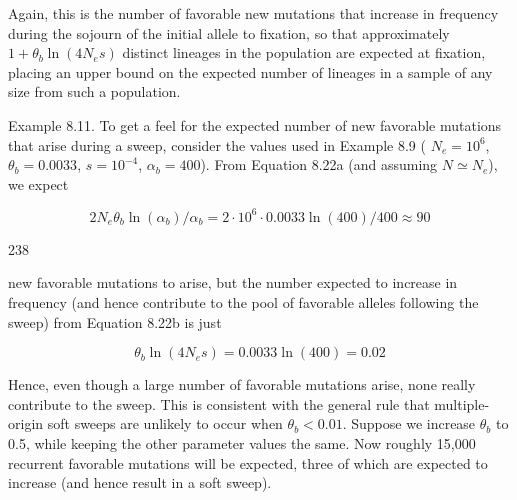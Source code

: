\documentclass{article}
\begin{document}
Again, this is the number of favorable new mutations that increase in frequency during the sojourn of the initial allele to fixation, so that approximately  $ 1 + \theta_b \ln(4N_e s) $ distinct lineages in the population are expected at fixation, placing an upper bound on the expected number of lineages in a sample of any size from such a population.

Example 8.11. To get a feel for the expected number of new favorable mutations that arise during a sweep, consider the values used in Example 8.9 ( $ N_e = 10^6 $,  $ \theta_b = 0.0033 $,  $ s = 10^{-4} $,  $ \alpha_b = 400 $). From Equation 8.22a (and assuming  $ N \simeq N_e $), we expect

\begin{equation}
2N_{e}\theta_{b}\ln(\alpha_{b})/\alpha_{b}=2\cdot10^{6}\cdot0.0033\ln(400)/400\approx90
\end{equation}

238

new favorable mutations to arise, but the number expected to increase in frequency (and hence contribute to the pool of favorable alleles following the sweep) from Equation 8.22b is just

\begin{equation}
\theta_{b}\ln(4N_{e}s)=0.0033\ln(400)=0.02
\end{equation}

Hence, even though a large number of favorable mutations arise, none really contribute to the sweep. This is consistent with the general rule that multiple-origin soft sweeps are unlikely to occur when  $ \theta_b < 0.01 $. Suppose we increase  $ \theta_b $ to 0.5, while keeping the other parameter values the same. Now roughly 15,000 recurrent favorable mutations will be expected, three of which are expected to increase (and hence result in a soft sweep).
\end{document}

